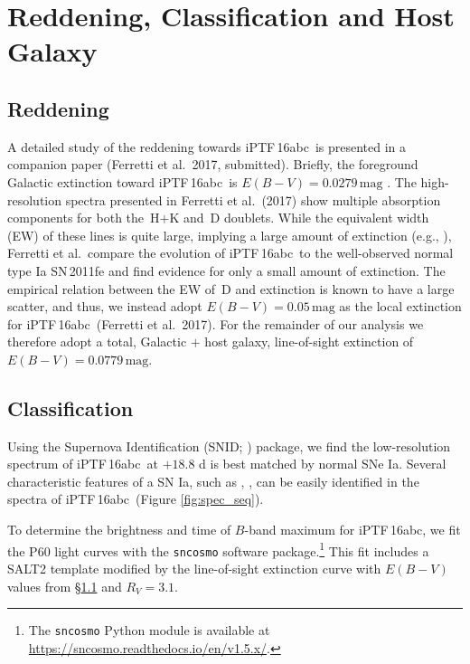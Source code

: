 \documentclass[twocolumn]{aastex61}
\newcommand{\abc}{iPTF\,16abc}
\begin{document}
\section{Reddening, Classification and Host Galaxy}
\label{sec:usual_staff}

\subsection{Reddening}
\label{sec:reddening}

A detailed study of the reddening towards \abc\ is presented in a 
companion paper (Ferretti et al.\ 2017, submitted). Briefly, the 
foreground Galactic extinction toward \abc\
is $E(B-V) = 0.0279 \, \mathrm{mag}$ \citep{2011ApJ...737..103S}. The high-resolution spectra presented in Ferretti et al.\ (2017) show multiple absorption components for both the \,H$+$K and \,D doublets. While the equivalent width (EW) of these lines is quite large, implying a large amount of extinction (e.g., \citealt{2012MNRAS.426.1465P}), Ferretti et al.\ compare the evolution of \abc\ to the well-observed normal type Ia SN\,2011fe and find evidence for only a small amount of extinction. The empirical relation between the EW of \,D and extinction is known to have a large scatter, and thus, we instead adopt $E(B-V) = 0.05 \, \mathrm{mag}$ as the local extinction for \abc\ (Ferretti et al.\ 2017). For the remainder of our analysis we therefore adopt a total, Galactic $+$ host galaxy, line-of-sight extinction of $E(B-V) = 0.0779 \, \mathrm{mag}$.

\subsection{Classification}
\label{sec:classification}

Using the Supernova Identification (SNID; \citealt{2007ApJ...666.1024B}) package, 
we find the low-resolution spectrum of \abc\ at $+18.8$ d is best matched by normal SNe Ia. Several characteristic features of a SN
Ia, such as \ion{Si}{2}, \ion{S}{2}, can be easily identified in the
spectra of \abc\ (Figure \ref{fig:spec_seq}).

To determine the brightness and time of $B$-band maximum for 
\abc, we fit the P60 light curves with the \texttt{sncosmo} software package.\footnote{The
  \texttt{sncosmo} Python module is available at
  \url{https://sncosmo.readthedocs.io/en/v1.5.x/}.} This fit includes a SALT2 template \citep{2007A&A...466...11G} modified by the line-of-sight extinction
curve \citep{1999PASP..111...63F} with $E(B-V)$ values from 
\S\ref{sec:reddening} and $R_V=3.1$.
\end{document}
